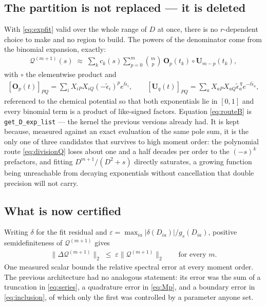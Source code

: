\documentclass[11pt]{article}
\newcommand{\mat}[1]{{\mathbf{#1}}}
\newcommand{\sqrbrckts}[1]{\left[#1\right]}
\newcommand{\Qcal}{\mathcal{Q}}
\newcommand{\eb}{\tilde{\epsilon}}
\newcommand{\Had}{\circ}
\newcommand{\code}[1]{\texttt{\small #1}}
\begin{document}
\subsection{The partition is not replaced --- it is deleted}

With \eqref{eq:expfit} valid over the whole range of $D$ at once, there is no $r$-dependent
choice to make and no region to build. The powers of the denominator come from the binomial
expansion, exactly:
\begin{align}
    \Qcal^{(m+1)}(s) \;\approx\; \sum_k c_k(s) \sum_{p=0}^{m} \binom{m}{p}\,
        \mat{O}_p(t_k) \Had \mat{U}_{m-p}(t_k) ,
    \label{eq:routeB}
\end{align}
with $\Had$ the elementwise product and
\begin{align}
    \sqrbrckts{\mat{O}_p(t)}_{PQ} = \sum_i X_{iP} X_{iQ} (-\eb_i)^p e^{t\eb_i} ,
    \qquad
    \sqrbrckts{\mat{U}_q(t)}_{PQ} = \sum_a X_{aP} X_{aQ} \eb_a^{\,q} e^{-t\eb_a} ,
\end{align}
referenced to the chemical potential so that both exponentials lie in $[0,1]$ and every
binomial term is a product of like-signed factors. Equation \eqref{eq:routeB} is
\code{get\_D\_exp\_list} --- the kernel the previous versions already had. It is kept
because, measured against an exact evaluation of the same pole sum, it is the only one of
three candidates that survives to high moment order: the polynomial route
\eqref{eq:divisionQ} loses about one and a half decades per order to the $(-s)^k$
prefactors, and fitting $D^{m+1}/(D^2+s)$ directly saturates, a growing function being
unreachable from decaying exponentials without cancellation that double precision will not
carry.

\subsection{What is now certified}

Writing $\delta$ for the fit residual and $\varepsilon = \max_{ia} |\delta(D_{ia})| /
g_s(D_{ia})$, positive semidefiniteness of $\Qcal^{(m+1)}$ gives
\begin{align}
    \big\| \Delta \Qcal^{(m+1)} \big\|_2 \;\le\; \varepsilon \big\| \Qcal^{(m+1)} \big\|_2
    \qquad \text{for every } m .
\end{align}
One measured scalar bounds the relative spectral error at every moment order. The previous
architecture had no analogous statement: its error was the sum of a truncation in
\eqref{eq:series}, a quadrature error in \eqref{eq:Mp}, and a boundary error in
\eqref{eq:inclusion}, of which only the first was controlled by a parameter anyone set.
\end{document}
